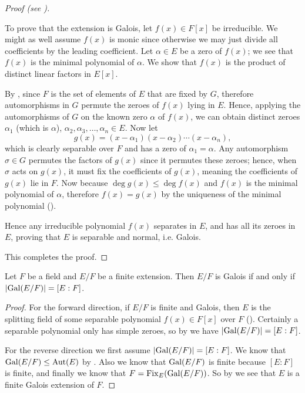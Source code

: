 \begin{proof}[Proof (see {\cite[Theorem 23.19]{judson_beezer_2022}})]
\begin{itemize}
        To prove that the extension is Galois, let $f(x) \in F[x]$ be irreducible. We might as well assume $f(x)$ is monic since otherwise we may just divide all coefficients by the leading coefficient. Let $\alpha \in E$ be a zero of $f(x)$; we see that $f(x)$ is the minimal polynomial of $\alpha$. We show that $f(x)$ is the product of distinct linear factors in $E[x]$.

        By , since $F$ is the set of elements of $E$ that are fixed by $G$, therefore automorphisms in $G$ permute the zeroes of $f(x)$ lying in $E$. Hence, applying the automorphisms of $G$ on the known zero $\alpha$ of $f(x)$, we can obtain distinct zeroes $\alpha_1$ (which is $\alpha$), $\alpha_2, \alpha_3, \dots, \alpha_n \in E$. Now let
        \[
            g(x) = (x-\alpha_1)(x-\alpha_2)\cdots(x-\alpha_n),
        \]
        which is clearly separable over $F$ and has a zero of $\alpha_1 = \alpha$. Any automorphism $\sigma \in G$ permutes the factors of $g(x)$ since it permutes these zeroes; hence, when $\sigma$ acts on $g(x)$, it must fix the coefficients of $g(x)$, meaning the coefficients of $g(x)$ lie in $F$. Now because $\deg g(x) \leq \deg f(x)$ and $f(x)$ is the minimal polynomial of $\alpha$, therefore $f(x) = g(x)$ by the uniqueness of the minimal polynomial ().

        Hence any irreducible polynomial $f(x)$ separates in $E$, and has all its zeroes in $E$, proving that $E$ is separable and normal, i.e. Galois.
    \end{itemize}
    This completes the proof.
\end{proof}

\begin{corollary}\label{corollary-galois-iff-galois-field-has-order-of-degree-of-field-extension}
    Let $F$ be a field and $E/F$ be a finite extension. Then $E/F$ is Galois if and only if $|\mathrm{Gal}(E/F)| = [E:F]$.
\end{corollary}
\begin{proof}
    For the forward direction, if $E/F$ is finite and Galois, then $E$ is the splitting field of some separable polynomial $f(x) \in F[x]$ over $F$ (). Certainly a separable polynomial only has simple zeroes, so by  we have $|\mathrm{Gal}(E/F)| = [E:F]$.

    For the reverse direction we first assume $|\mathrm{Gal}(E/F)| = [E:F]$. We know that $\mathrm{Gal}(E/F) \leq \mathrm{Aut}(E)$ by . Also we know that $\mathrm{Gal}(E/F)$ is finite because $[E:F]$ is finite, and finally we know that $F = \mathrm{Fix}_{E}(\mathrm{Gal}(E/F))$. So by  we see that $E$ is a finite Galois extension of $F$.
\end{proof}

